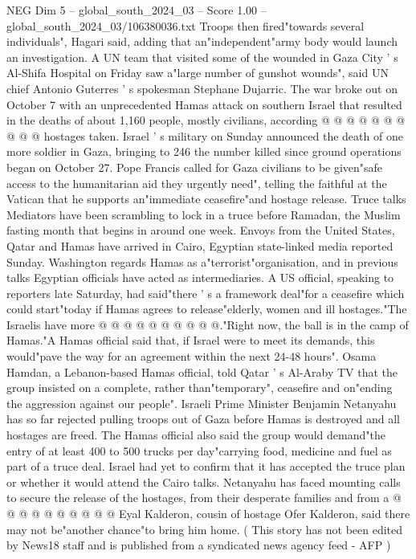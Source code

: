 \begin{textsample}{NEG Dim 5 – global\_south\_2024\_03 – Score 1.00 – global\_south\_2024\_03/106380036.txt}
Troops then fired"towards several individuals", Hagari said, adding that an"independent"army body would launch an investigation.
A UN team that visited some of the wounded in Gaza City ' s Al-Shifa Hospital on Friday saw a"large number of gunshot wounds", said UN chief Antonio Guterres ' s spokesman Stephane Dujarric.
The war broke out on October 7 with an unprecedented Hamas attack on southern Israel that resulted in the deaths of about 1,160 people, mostly civilians, according @ @ @ @ @ @ @ @ @ @ hostages taken.
Israel ' s military on Sunday announced the death of one more soldier in Gaza, bringing to 246 the number killed since ground operations began on October 27.
Pope Francis called for Gaza civilians to be given"safe access to the humanitarian aid they urgently need", telling the faithful at the Vatican that he supports an"immediate ceasefire"and hostage release.
Truce talks Mediators have been scrambling to lock in a truce before Ramadan, the Muslim fasting month that begins in around one week.
Envoys from the United States, Qatar and Hamas have arrived in Cairo, Egyptian state-linked media reported Sunday.
Washington regards Hamas as a"terrorist"organisation, and in previous talks Egyptian officials have acted as intermediaries.
A US official, speaking to reporters late Saturday, had said"there ' s a framework deal"for a ceasefire which could start"today if Hamas agrees to release"elderly, women and ill hostages."The Israelis have more @ @ @ @ @ @ @ @ @ @."Right now, the ball is in the camp of Hamas."A Hamas official said that, if Israel were to meet its demands, this would"pave the way for an agreement within the next 24-48 hours".
Osama Hamdan, a Lebanon-based Hamas official, told Qatar ' s Al-Araby TV that the group insisted on a complete, rather than"temporary", ceasefire and on"ending the aggression against our people".
Israeli Prime Minister Benjamin Netanyahu has so far rejected pulling troops out of Gaza before Hamas is destroyed and all hostages are freed.
The Hamas official also said the group would demand"the entry of at least 400 to 500 trucks per day"carrying food, medicine and fuel as part of a truce deal.
Israel had yet to confirm that it has accepted the truce plan or whether it would attend the Cairo talks.
Netanyahu has faced mounting calls to secure the release of the hostages, from their desperate families and from a @ @ @ @ @ @ @ @ @ @ Eyal Kalderon, cousin of hostage Ofer Kalderon, said there may not be"another chance"to bring him home. ( This story has not been edited by News18 staff and is published from a syndicated news agency feed - AFP )

\end{textsample}

